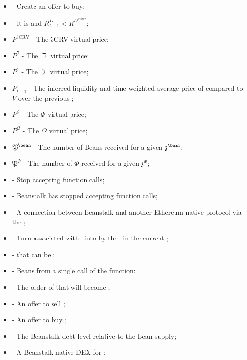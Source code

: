 \documentclass[class=article, crop=false]{standalone}
\begin{document}
\begin{itemize}[topsep=0pt, itemsep=3pt,leftmargin=16pt]
    \item[]  - Create an offer to buy;
    \item[]  - It is  and $R^D_{t-1} < R^{D^{\text{lower}}}$;
    \item[] $P^{\text{3CRV}}$ - The 3CRV virtual price;
    \item[] $P^{\daleth}$ - The $\daleth$ virtual price;
    \item[] $P^{\gimel}$ - The $\gimel$ virtual price;
    \item[] $P_{\overline{t-1}}$ - The inferred liquidity and time weighted average price of  compared to $V$ over the previous ;
    \item[] $P^{\Phi}$ - The $\Phi$ virtual price;
    \item[] $P^{\Omega}$ - The $\Omega$ virtual price;
    \item[] $\mathfrak{P}^{\bean}$ - The number of Beans received for  a given $\mathfrak{z}^{\bean}$;
    \item[] $\mathfrak{P}^{\Phi}$ - The number of $\Phi$ received for  a given $\mathfrak{z}^{\Phi}$;
    \item[]  - Stop accepting  function calls;
    \item[]  - Beanstalk has stopped accepting  function calls;
    \item[]  - A connection between Beanstalk and another Ethereum-native protocol via the ;
    \item[]  - Turn  associated with  \Bean\ into  by  the  \Bean\ in the current ;
    \item[]   -  that can be ;
    \item[]  - Beans  from a single call of the  function;
    \item[]  - The order of  that will become ;
    \item[]  - An offer to sell ;
    \item[]  - An offer to buy ;
    \item[]  - The Beanstalk debt level relative to the Bean supply;
    \item[]   - A Beanstalk-native DEX for ;

\end{itemize}
\end{document}
